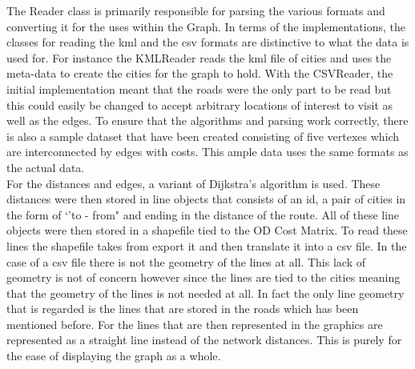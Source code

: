 \documentclass[midd]{thesis}
\newcommand{\tab}{\hspace*{2em}}
\begin{document}
\tab The Reader class is primarily responsible for parsing the various formats and converting it for the uses within the Graph. In terms of the implementations, the classes for reading the kml and the csv formats are distinctive to what the data is used for. For instance the KMLReader reads the kml file of cities and uses the meta-data to create the cities for the graph to hold. With the CSVReader, the initial implementation meant that the roads were the only part to be read but this could easily be changed to accept arbitrary locations of interest to visit as well as the edges. To ensure that the algorithms and parsing work correctly, there is also a sample dataset that have been created consisting of five vertexes which are interconnected by edges with costs. This ample data uses the same formats as the actual data.\\
\tab For the distances and edges, a variant of Dijkstra's algorithm is used\cite{gis}. These distances were then stored in line objects that consists of an id, a pair of cities in the form of `'to - from" and ending in the distance of the route. All of these line objects were then stored in a shapefile tied to the OD Cost Matrix. To read these lines the shapefile takes from export it and then translate it into a csv file. In the case of a csv file there is not the geometry of the lines at all. This lack of geometry is not of concern however since the lines are tied to the cities meaning that the geometry of the lines is not needed at all. In fact the only line geometry that is regarded is the lines that are stored in the roads which has been mentioned before. For the lines that are then represented in the graphics are represented as a straight line instead of the network distances. This is purely for the ease of displaying the graph as a whole.\\ 
\end{document}
